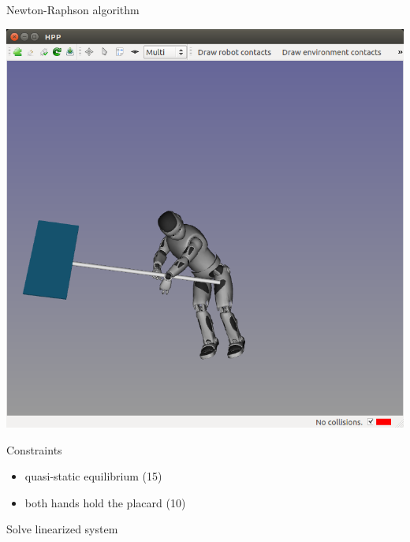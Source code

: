 \begin {frame} {Newton-Raphson algorithm}
  \parbox {.5\linewidth} {
    \centerline {
      \includegraphics [width=\linewidth] {figures/seq/romeo-3.png}
    }
  }
  \hspace*{.05\linewidth}
  \parbox {.39\linewidth} {
    Constraints
    \begin {itemize}
    \item quasi-static equilibrium (15)
    \item both hands hold the placard (10)
    \end{itemize}
  }
  \centerline {
    Solve linearized system
  }
\end {frame}


